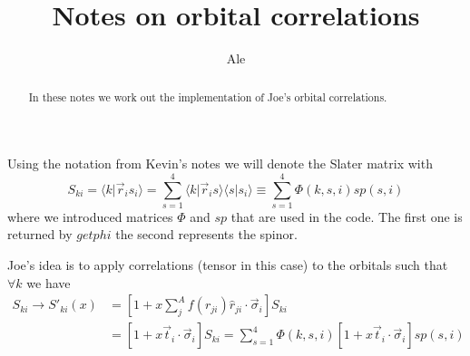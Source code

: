 \documentclass[a4paper]{article}
\title{Notes on orbital correlations}
\author{Ale}
\begin{document}
\maketitle

\begin{abstract}
In these notes we work out the implementation of Joe's orbital correlations.
\end{abstract}

Using the notation from Kevin's notes we will denote the Slater matrix with
\begin{equation}
S_{ki}=\langle k \vert \vec{r}_i s_i\rangle = \sum^4_{s=1} \langle k \vert \vec{r}_i s\rangle \langle s\vert s_i \rangle \equiv \sum^4_{s=1} \Phi(k,s,i) sp(s,i)
\end{equation}
where we introduced matrices $\Phi$ and $sp$ that are used in the code. The first one is returned by $getphi$ the second represents the spinor.

Joe's idea is to apply correlations (tensor in this case) to the orbitals such that $\forall k$ we have
\begin{equation}
\begin{split}
S_{ki} \to S'_{ki}(x) &= \left[ 1 + x \sum_j^A f(r_{ji}) \hat{r}_{ji}\cdot\vec{\sigma}_i\right]S_{ki}\\
&= \left[ 1 + x \vec{t}_i\cdot\vec{\sigma}_i\right]S_{ki}= \sum^4_{s=1} \Phi(k,s,i) \left[ 1 + x \vec{t}_i\cdot\vec{\sigma}_i\right] sp(s,i)\\
\end{split}
\end{equation}
\end{document}
